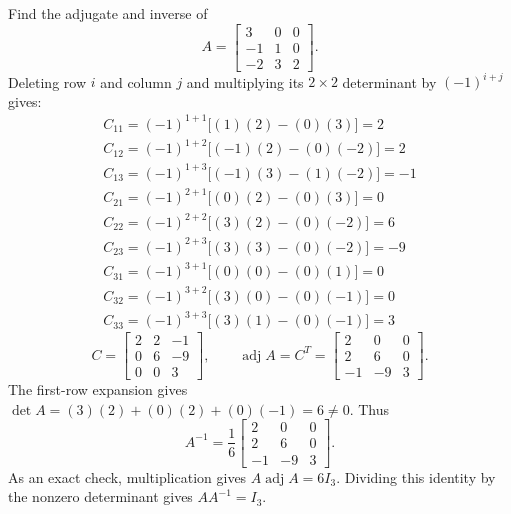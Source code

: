 \goal Find the adjugate and inverse of
\[A=\begin{bmatrix}3&0&0\\-1&1&0\\-2&3&2\end{bmatrix}.\]
Deleting row $i$ and column $j$ and multiplying its $2\times2$ determinant by $(-1)^{i+j}$ gives:
\[\begin{gathered}
C_{11}=(-1)^{1+1}\big[(1)(2)-(0)(3)\big]=2\\C_{12}=(-1)^{1+2}\big[(-1)(2)-(0)(-2)\big]=2\\C_{13}=(-1)^{1+3}\big[(-1)(3)-(1)(-2)\big]=-1\\C_{21}=(-1)^{2+1}\big[(0)(2)-(0)(3)\big]=0\\C_{22}=(-1)^{2+2}\big[(3)(2)-(0)(-2)\big]=6\\C_{23}=(-1)^{2+3}\big[(3)(3)-(0)(-2)\big]=-9\\C_{31}=(-1)^{3+1}\big[(0)(0)-(0)(1)\big]=0\\C_{32}=(-1)^{3+2}\big[(3)(0)-(0)(-1)\big]=0\\C_{33}=(-1)^{3+3}\big[(3)(1)-(0)(-1)\big]=3
\end{gathered}\]
\[C=\begin{bmatrix}2&2&-1\\0&6&-9\\0&0&3\end{bmatrix},\qquad\operatorname{adj}A=C^T=\begin{bmatrix}2&0&0\\2&6&0\\-1&-9&3\end{bmatrix}.\]
The first-row expansion gives $\det A=(3)(2) + (0)(2) + (0)(-1)=6\ne0$. Thus
\[A^{-1}=\frac{1}{6}\begin{bmatrix}2&0&0\\2&6&0\\-1&-9&3\end{bmatrix}.\]
As an exact check, multiplication gives $A\operatorname{adj}A=6I_3$. Dividing this identity by the nonzero determinant gives $AA^{-1}=I_3$.


